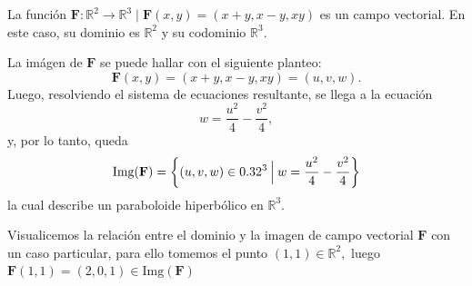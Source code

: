   
    \begin{example}  \label{ej:campoVectorial}
        La función $\mathbf{F}:\mathbb{R}^2 \rightarrow \mathbb{R}^3 \;|\; \mathbf{F}(x,y) = (x+y,x-y,xy)$ es un campo vectorial. 
        En este caso, su dominio es $\mathbb{R}^2 $ y su codominio $\mathbb{R}^3 $.
        
      La imágen de $\mathbf{F}$ se puede hallar con el siguiente planteo:
        \begin{equation*}
          \mathbf{F}(x,y) = (x+y,x-y,xy) = (u,v,w)  .
        \end{equation*}
        Luego, resolviendo el sistema de ecuaciones resultante, se llega a la ecuación
        \begin{equation*}
          w = \frac{u^2}{4}-\frac{v^2}{4},
        \end{equation*} y, por lo tanto, queda 
         \begin{equation}\label{imagF}
          \text{Img}(\mathbf{F})=\left\{ (u,v,w)\in0.32^3 \:\Big|\: w=\frac{u^2}{4}-\frac{v^2}{4} \right\}
        \end{equation}  la cual describe  un paraboloide hiperbólico en $\mathbb{R}^3.$ 
       
Visualicemos  la relaci\'on entre  el dominio y la imagen de campo vectorial $\mathbf{F}$ con un caso particular, para ello tomemos el punto $(1,1) \in \mathbb{R}^{2},$  luego $ \mathbf{F}(1,1)=(2,0,1) \in  \text{Img}(\mathbf{F})$
 
 \begin{figure}[H]
  \begin{center}
\end{center}
\end{figure}
\end{example}
